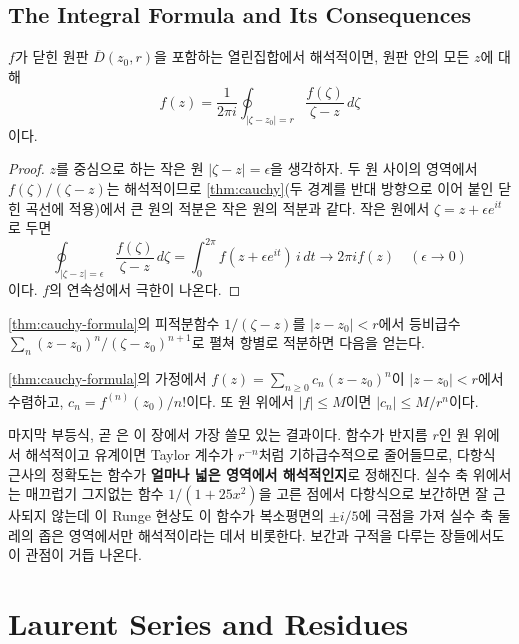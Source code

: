 \subsection{The Integral Formula and Its Consequences}

\begin{theorem}[Cauchy 적분 공식]
\label{thm:cauchy-formula}
$f$가 닫힌 원판 $\overline{D}(z_0,r)$을 포함하는 열린집합에서 해석적이면, 원판 안의 모든 $z$에 대해
\[
f(z)=\frac{1}{2\pi i}\oint_{|\zeta-z_0|=r}\frac{f(\zeta)}{\zeta-z}\,d\zeta
\]
이다.
\end{theorem}

\begin{proof}
$z$를 중심으로 하는 작은 원 $|\zeta-z|=\epsilon$을 생각하자. 두 원 사이의 영역에서 $f(\zeta)/(\zeta-z)$는 해석적이므로 \cref{thm:cauchy}(두 경계를 반대 방향으로 이어 붙인 닫힌 곡선에 적용)에서 큰 원의 적분은 작은 원의 적분과 같다. 작은 원에서 $\zeta=z+\epsilon e^{it}$로 두면
\[
\oint_{|\zeta-z|=\epsilon}\frac{f(\zeta)}{\zeta-z}\,d\zeta=\int_0^{2\pi}f(z+\epsilon e^{it})\,i\,dt\to2\pi if(z)\quad(\epsilon\to0)
\]
이다. $f$의 연속성에서 극한이 나온다.
\end{proof}

\cref{thm:cauchy-formula}의 피적분함수 $1/(\zeta-z)$를 $|z-z_0|<r$에서 등비급수 $\sum_n(z-z_0)^n/(\zeta-z_0)^{n+1}$로 펼쳐 항별로 적분하면 다음을 얻는다.

\begin{corollary}
\label{cor:cauchy-estimates}
\cref{thm:cauchy-formula}의 가정에서 $f(z)=\sum_{n\ge0}c_n(z-z_0)^n$이 $|z-z_0|<r$에서 수렴하고, $c_n=f^{(n)}(z_0)/n!$이다. 또 원 위에서 $|f|\le M$이면 $|c_n|\le M/r^n$이다.
\end{corollary}

마지막 부등식, 곧 은 이 장에서 가장 쓸모 있는 결과이다. 함수가 반지름 $r$인 원 위에서 해석적이고 유계이면 Taylor 계수가 $r^{-n}$처럼 기하급수적으로 줄어들므로, 다항식 근사의 정확도는 함수가 \textbf{얼마나 넓은 영역에서 해석적인지}로 정해진다. 실수 축 위에서는 매끄럽기 그지없는 함수 $1/(1+25x^2)$을 고른 점에서 다항식으로 보간하면 잘 근사되지 않는데 이 Runge 현상도 이 함수가 복소평면의 $\pm i/5$에 극점을 가져 실수 축 둘레의 좁은 영역에서만 해석적이라는 데서 비롯한다. 보간과 구적을 다루는 장들에서도 이 관점이 거듭 나온다.

\section{Laurent Series and Residues}
\label{sec:residues}

